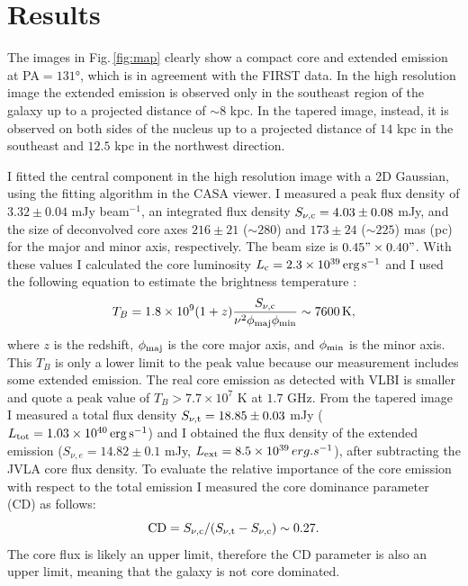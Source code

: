 \documentclass[../main.tex]{subfiles}
\begin{document}
\section{Results}
\label{sec:results}


The images in Fig.\,\ref{fig:map} clearly show a compact core and extended emission at PA$=\ang{131}$, which is in agreement with the FIRST data.
In the high resolution image the extended emission is observed only in the southeast region of the galaxy up to a projected distance of $\sim 8$ kpc.
In the tapered image, instead, it is observed on both sides of the nucleus up to a projected distance of $14$ kpc in the southeast and $12.5$ kpc in the northwest direction. 

I fitted the central component in the high resolution image with a 2D Gaussian, using the fitting algorithm in the CASA viewer.
I measured a peak flux density of $3.32\pm0.04$ mJy beam$^{-1}$, an integrated flux density $S_{\nu,\rm c}=4.03\pm0.08$ mJy, and the size of deconvolved core axes $216\pm21$ ($\sim 280$) and $173\pm24$ ($\sim225$) mas (pc) for the major and minor axis, respectively.
The beam size is $0.45"\times0.40"$. 
With these values I calculated the core luminosity $L_{\rm c}=2.3\times 10^{39}\,\si{erg.s^{-1}}$ and I used the following equation to estimate the brightness temperature \citep{Doi13}: 
\begin{equation}
\label{eq:Tb}
T_B=1.8\times 10^9 (1+z)\frac{S_{\nu,\rm c}}{\nu^2\phi_{\rm maj}\phi_{\rm min}}\sim7600 {\rm\, K},
\end{equation}
where $z$ is the redshift, $\phi_{\rm maj}$ is the core major axis, and $\phi_{\rm min}$ is the minor axis.
This $T_B$ is only a lower limit to the peak value because our measurement includes some extended emission.
The real core emission as detected with VLBI is smaller and \citet{Doi13} quote a peak value of $T_B>7.7\times 10^7$ K at $1.7$ GHz.
From the tapered image I measured a total flux density $S_{\nu,\rm t} = 18.85 \pm 0.03$ mJy ($L_{\rm tot}=1.03\times10^{40}\,\si{erg.s^{-1}}$) and I obtained the flux density of the extended emission ($S_{\nu,e} = 14.82\pm0.1$ mJy, $L_{\rm ext}=8.5\times10^{39}\,erg.s^{-1}$), after subtracting the JVLA core flux density.
To evaluate the relative importance of the core emission with respect to the total emission I measured the core dominance parameter (CD) as follows:
\begin{equation}
\label{eq:cd}
{\rm CD}=S_{\nu,\rm c}/(S_{\nu,\rm t}-S_{\nu,\rm c})\sim0.27.
\end{equation}
The core flux is likely an upper limit, therefore the CD parameter is also an upper limit, meaning that the galaxy is not core dominated.
\end{document}
